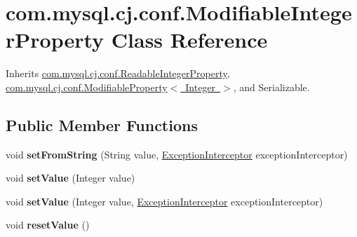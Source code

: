 \hypertarget{classcom_1_1mysql_1_1cj_1_1conf_1_1_modifiable_integer_property}{}\section{com.\+mysql.\+cj.\+conf.\+Modifiable\+Integer\+Property Class Reference}
\label{classcom_1_1mysql_1_1cj_1_1conf_1_1_modifiable_integer_property}


Inherits \mbox{\hyperlink{classcom_1_1mysql_1_1cj_1_1conf_1_1_readable_integer_property}{com.\+mysql.\+cj.\+conf.\+Readable\+Integer\+Property}}, \mbox{\hyperlink{interfacecom_1_1mysql_1_1cj_1_1conf_1_1_modifiable_property}{com.\+mysql.\+cj.\+conf.\+Modifiable\+Property$<$ Integer $>$}}, and Serializable.

\subsection*{Public Member Functions}
\begin{DoxyCompactItemize}
\item 
\mbox{\label{classcom_1_1mysql_1_1cj_1_1conf_1_1_modifiable_integer_property_abb2ce326bfd6294cd99992b21477a40d}} 
void {\bfseries set\+From\+String} (String value, \mbox{\hyperlink{interfacecom_1_1mysql_1_1cj_1_1exceptions_1_1_exception_interceptor}{Exception\+Interceptor}} exception\+Interceptor)
\item 
\mbox{\label{classcom_1_1mysql_1_1cj_1_1conf_1_1_modifiable_integer_property_adec8722a38cd0ef777d800e69534f4ba}} 
void {\bfseries set\+Value} (Integer value)
\item 
\mbox{\label{classcom_1_1mysql_1_1cj_1_1conf_1_1_modifiable_integer_property_a894cea497861193a8aae97e09e43f2a0}} 
void {\bfseries set\+Value} (Integer value, \mbox{\hyperlink{interfacecom_1_1mysql_1_1cj_1_1exceptions_1_1_exception_interceptor}{Exception\+Interceptor}} exception\+Interceptor)
\item 
\mbox{\label{classcom_1_1mysql_1_1cj_1_1conf_1_1_modifiable_integer_property_a7c5a274b1082ddd9d854a359bbabae6c}} 
void {\bfseries reset\+Value} ()
\end{DoxyCompactItemize}
